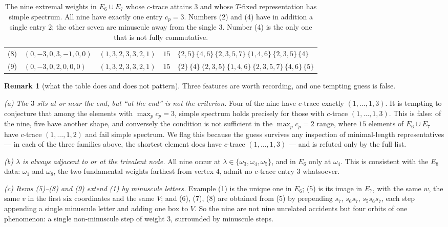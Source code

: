 \documentclass[reqno]{amsart}
\theoremstyle{plain}
\theoremstyle{definition}
\newtheorem{remark}[theorem]{Remark}
\newcommand{\la}{\lambda}
\newcommand{\om}{\omega}
\begin{document}
\begin{table}[ht]
\begin{tabular}{@{}rllrl@{}}
(8) & $(0,-3,0,3,-1,0,0)$ & $(1,3,2,3,3,2,1)$ & $15$ & $\{2,5\}\,\{4,6\}\,\{2,3,5,7\}\,\{1,4,6\}\,\{2,3,5\}\,\{4\}$ \\
(9) & $(0,-3,0,2,0,0,0)$ & $(1,3,2,3,3,2,1)$ & $15$ & $\{2\}\,\{4\}\,\{2,3,5\}\,\{1,4,6\}\,\{2,3,5,7\}\,\{4,6\}\,\{5\}$ \\
\bottomrule
\end{tabular}
\medskip
\caption{The nine extremal weights in $E_6\cup E_7$ whose $c$-trace attains
$3$ and whose $T$-fixed representation has simple spectrum.  All nine have
exactly one entry $c_p=3$.  Numbers (2) and (4) have in addition a single
entry $2$; the other seven are minuscule away from the single $3$.  Number
(4) is the only one that is not fully commutative.}
\label{tab:nine}
\end{table}

\begin{remark}[what the table does and does not pattern]\label{rem:pattern}
Three features are worth recording, and one tempting guess is false.

\emph{(a) The $3$ sits at or near the end, but ``at the end'' is not the
criterion.}  Four of the nine have $c$-trace exactly $(1,\dots,1,3)$.  It is
tempting to conjecture that among the elements with $\max_pc_p=3$, simple
spectrum holds precisely for those with $c$-trace $(1,\dots,1,3)$.  This is
false: of the nine, five have another shape, and conversely the condition is
not sufficient in the $\max_pc_p=2$ range, where $15$ elements of $E_6\cup
E_7$ have $c$-trace $(1,\dots,1,2)$ and fail simple spectrum.  We flag this
because the guess survives any inspection of minimal-length representatives
--- in each of the three families above, the shortest element does have
$c$-trace $(1,\dots,1,3)$ --- and is refuted only by the full list.

\emph{(b) $\la$ is always adjacent to or at the trivalent node.}  All nine
occur at $\la\in\{\om_3,\om_4,\om_5\}$, and in $E_6$ only at $\om_4$.  This is
consistent with the $E_8$ data: $\om_1$ and $\om_8$, the two fundamental
weights farthest from vertex $4$, admit no $c$-trace entry $3$ whatsoever.

\emph{(c) Items (5)--(8) and (9) extend (1) by minuscule letters.}  Example
(1) is the unique one in $E_6$; (5) is its image in $E_7$, with the same $w$,
the same $v$ in the first six coordinates and the same $V$; and (6), (7), (8)
are obtained from (5) by prepending $s_7$, $s_6s_7$, $s_5s_6s_7$, each step
appending a single minuscule letter and adding one box to $V$.  So the nine
are not nine unrelated accidents but four orbits of one phenomenon: a single
non-minuscule step of weight $3$, surrounded by minuscule steps.


\end{remark}
\end{document}
